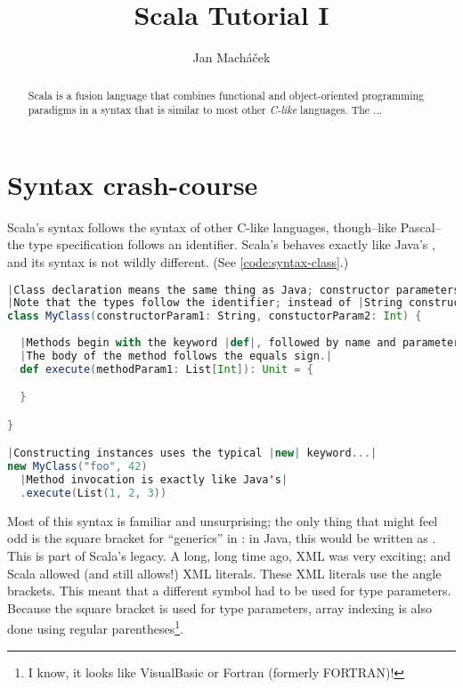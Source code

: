 \documentclass[10 pt]{article}
\title{Scala Tutorial I}
\author{Jan Macháček}
\begin{document}
\maketitle
\begin{abstract}
  Scala is a fusion language that combines functional and object-oriented programming paradigms in a syntax that is similar to most other \emph{C-like} languages. The ...
\end{abstract}
\bigskip

\section{Syntax crash-course}
Scala's syntax follows the syntax of other C-like languages, though--like Pascal--the type specification follows an identifier. Scala's  behaves exactly like Java's , and its syntax is not wildly different. (See \autoref{code:syntax-class}.)

\begin{lstlisting}[caption={Classes and methods}, label={code:syntax-class}, language=Scala, escapechar=|]
|Class declaration means the same thing as Java; constructor parameters are specified in the block immediately following the class name.|
|Note that the types follow the identifier; instead of |String constructorParam1| Scala uses |constructorParam1: String
class MyClass(constructorParam1: String, constuctorParam2: Int) {
  
  |Methods begin with the keyword |def|, followed by name and parameters. The return type follows similar pattern; |Unit| means |void.
  |The body of the method follows the equals sign.|
  def execute(methodParam1: List[Int]): Unit = {

  }

}

|Constructing instances uses the typical |new| keyword...|
new MyClass("foo", 42)
  |Method invocation is exactly like Java's|
  .execute(List(1, 2, 3))
\end{lstlisting}

Most of this syntax is familiar and unsurprising; the only thing that might feel odd is the square bracket for ``generics'' in : in Java, this would be written as . This is part of Scala's legacy. A long, long time ago, XML was very exciting; and Scala allowed (and still allows!) XML literals. These XML literals use the angle brackets. This meant that a different symbol had to be used for type parameters. Because the square bracket is used for type parameters, array indexing is also done using regular parentheses\footnote{I know, it looks like VisualBasic or Fortran (formerly FORTRAN)!}.
\end{document}
